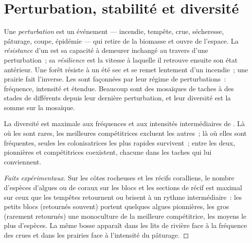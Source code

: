 \section{Perturbation, stabilité et diversité}

\begin{definition}\label{def:b1:ecosystem-dynamics:disturbance}
Une \emph{perturbation} est un événement --- incendie, tempête, crue,
sécheresse, pâturage, coupe, épidémie --- qui retire de la biomasse et
ouvre de l'espace. La \emph{résistance} d'un  est sa capacité
à demeurer inchangé au travers d'une perturbation~; sa
\emph{résilience} est la vitesse à laquelle il retrouve ensuite son
état antérieur. Une forêt résiste à un été sec et se remet lentement
d'un incendie~; une prairie fait l'inverse. Les  sont
façonnées par leur régime de perturbations~: fréquence, intensité et
étendue. Beaucoup sont des mosaïques de taches à des stades de
 différents depuis leur dernière perturbation, et leur
diversité est la somme sur la mosaïque.
\end{definition}

\begin{proposition}\label{prop:b1:ecosystem-dynamics:idh}
La diversité est maximale aux fréquences et aux intensités
intermédiaires de . Là où les  sont rares, les
meilleures compétitrices excluent les autres~; là où elles sont
fréquentes, seules les colonisatrices les plus rapides survivent~; entre
les deux, pionnières et compétitrices coexistent, chacune dans les
taches qui lui conviennent.
\end{proposition}
\begin{proof}[Faits expérimentaux]
Sur les côtes rocheuses et les récifs coralliens, le nombre d'espèces
d'algues ou de coraux sur les blocs et les sections de récif est
maximal sur ceux que les tempêtes retournent ou brisent à un rythme
intermédiaire~: les petits blocs (retournés souvent) portent quelques
algues pionnières, les gros (rarement retournés) une monoculture de la
meilleure compétitrice, les moyens le plus d'espèces. La même bosse
apparaît dans les lits de rivière face à la fréquence des crues et dans
les prairies face à l'intensité du pâturage.
\end{proof}

